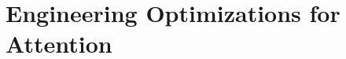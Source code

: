 \setcounter{chapter}{18}

\hypertarget{engineering-optimizations-for-attention}{%
\chapter{Engineering Optimizations for Attention}\label{engineering-optimizations-for-attention}}

